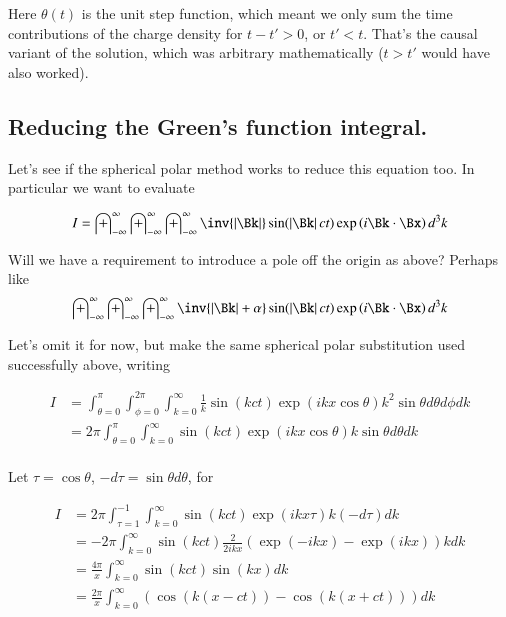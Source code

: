 \documentclass{article}
\newcommand{\IIinf}[0]{ \int_{-\infty}^\infty }
\begin{document}
Here $\theta(t)$ is the unit step function, which meant we only sum the time contributions of the charge density for $t - t' > 0$, or $t' < t$.  That's the causal variant of the solution, which was arbitrary mathematically ($t > t'$ would have also worked).

\subsection{ Reducing the Green's function integral. }

Let's see if the spherical polar method works to reduce this equation too.  In particular we want to evaluate

\begin{align*}
I = \IIinf \IIinf \IIinf \inv{\Abs{\Bk}} \sin( \Abs{\Bk} c t ) \exp\left( i \Bk \cdot \Bx \right) d^3 k
\end{align*}

Will we have a requirement to introduce a pole off the origin as above?  Perhaps like
\begin{align*}
\IIinf \IIinf \IIinf \inv{\Abs{\Bk} + \alpha} \sin( \Abs{\Bk} c t ) \exp\left( i \Bk \cdot \Bx \right) d^3 k
\end{align*}

Let's omit it for now, but make the same spherical polar substitution used successfully above, writing

\begin{align*}
I
&= \int_{\theta=0}^{\pi} \int_{\phi=0}^{2\pi} \int_{k=0}^\infty \frac{1}{k }
\sin\left( k c t \right) \exp\left( i k x \cos\theta \right)
k^2 \sin\theta d\theta d\phi dk \\
&= 2 \pi \int_{\theta=0}^{\pi} \int_{k=0}^\infty %
\sin\left( k c t \right) \exp\left( i k x \cos\theta \right)
k \sin\theta d\theta dk \\
\end{align*}

Let $\tau = \cos\theta$, $-d\tau = \sin\theta d\theta$, for

\begin{align*}
I
&= 2 \pi \int_{\tau=1}^{-1} \int_{k=0}^\infty %
\sin\left( k c t \right) \exp\left( i k x \tau \right)
k (-d\tau) dk \\
&= -2 \pi \int_{k=0}^\infty %
\sin\left( k c t \right)
\frac{2}{2i k x} \left( {\exp\left( -i k x \right) } -{\exp\left( i k x \right) } \right)
k dk \\
&= \frac{4 \pi }{x} \int_{k=0}^\infty %
\sin\left( k c t \right)
\sin\left( k x \right)
dk \\
&= \frac{2 \pi }{x} \int_{k=0}^\infty %
\left( \cos\left( k (x-c t) \right) -\cos\left( k (x+c t) \right) \right)
 dk \\
\end{align*}
\end{document}
